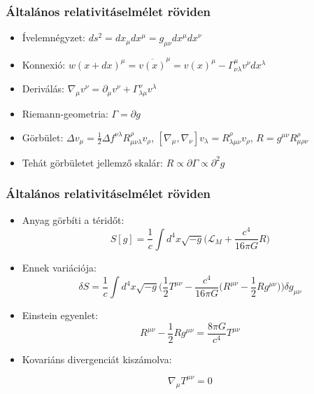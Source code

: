 \documentclass{beamer}
\begin{document}
\begin{frame}
\frametitle{Általános relativitáselmélet röviden}
\begin{itemize}
  \setlength{\itemsep}{16pt}

\item Ívelemnégyzet: $ds^2=dx_\mu dx^\mu=g_{\mu\nu} dx^\mu dx^\nu$
\item Konnexió: $w(x+dx)^\mu=\overline{v(x)}^\mu=v(x)^\mu-\Gamma_{\nu\lambda}^\mu v^\nu dx^\lambda$
\item Deriválás: $\nabla_\mu v^\nu=\partial_\mu v^\nu +\Gamma^{\nu}_{\lambda\mu}v^\lambda$
\item Riemann-geometria: $\Gamma = \partial g$
\item Görbület: $\Delta v_\mu =\frac{1}{2}\Delta f^{\nu\lambda}R^{\rho}_{\mu\nu\lambda}v_\rho$, $[\nabla_\mu,\nabla_\nu]v_\lambda = R^{\rho}_{\lambda\mu\nu}v_\rho$, $R=g^{\mu\nu}R_{\mu\rho\nu}^\rho$
\item Tehát görbületet jellemző skalár: $R\propto \partial \Gamma \propto \partial^2 g$
\end{itemize}

\end{frame}

\begin{frame}
\frametitle{Általános relativitáselmélet röviden}
\begin{itemize}
  \setlength{\itemsep}{16pt}
\item Anyag görbíti a téridőt:
\begin{equation*}
S[g]=\frac{1}{c}\int d^4x \sqrt{-g}\Big(\mathcal{L}_M+\frac{c^4}{16\pi G}R\Big) 
\end{equation*}
\item Ennek variációja:
\begin{equation*}
\delta S=\frac{1}{c}\int d^4x \sqrt{-g}\Big(\frac{1}{2}T^{\mu\nu}-\frac{c^4}{16\pi G}\big(R^{\mu\nu}-\frac{1}{2}Rg^{\mu\nu}\big)\Big)\delta g_{\mu\nu}
\end{equation*}
\item Einstein egyenlet:
\begin{equation*}
R^{\mu\nu}-\frac{1}{2}Rg^{\mu\nu}=\frac{8\pi G}{c^4}T^{\mu\nu}
\end{equation*}

\item Kovariáns divergenciát kiszámolva:

\begin{equation*}
\nabla_\mu T^{\mu\nu}=0
\end{equation*}

\end{itemize}


\end{frame}
\end{document}
